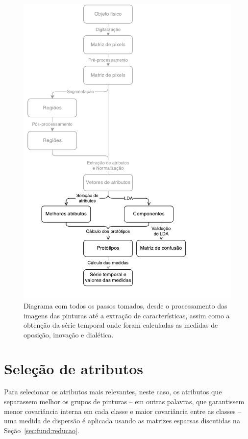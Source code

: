 \begin{figure}[ht!]
\begin{center}
        \includegraphics[scale=.8]{figs/dataflow_pintores3}
      \caption{Diagrama com todos os passos tomados, desde o processamento das
        imagens das pinturas até a extração de características, assim como a
        obtenção da série temporal onde foram calculadas as medidas de oposição,
        inovação e dialética.}
        \label{fig:dataflow}
\end{center}
\end{figure}

\section{Seleção de atributos}

Para selecionar os atributos mais relevantes, neste caso, os atributos que
separassem melhor os grupos de pinturas -- em outras palavras, que garantissem
menor covariância interna em cada classe e maior covariância entre as classes --
uma medida de dispersão é aplicada usando as matrizes esparsas discutidas na
Seção~\ref{sec:fund:reducao}.

